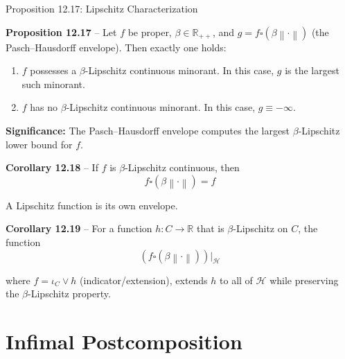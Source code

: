 \documentclass[aspectratio=169,10pt]{beamer}
\newcommand{\cH}{\mathcal{H}}
\newcommand{\R}{\mathbb{R}}
\newcommand{\norm}[1]{\left\|#1\right\|}
\newcommand{\co}{\square}
\begin{document}
\begin{frame}[allowframebreaks]{Proposition 12.17: Lipschitz Characterization}

  \textbf{Proposition 12.17} -- Let $f$ be proper, $\beta \in \R_{++}$,
  and $g = f \co (\beta \norm{\cdot})$ (the Pasch--Hausdorff envelope).
  Then exactly one holds:

  \begin{enumerate}
    \item[(i)] $f$ possesses a $\beta$-Lipschitz continuous minorant.
      In this case, $g$ is the largest such minorant.

    \item[(ii)] $f$ has no $\beta$-Lipschitz continuous minorant.
      In this case, $g \equiv -\infty$.
  \end{enumerate}

  \vspace{1cm}

  \textbf{Significance:} The Pasch--Hausdorff envelope computes the
  largest $\beta$-Lipschitz lower bound for $f$.

  \framebreak

  \textbf{Corollary 12.18} -- If $f$ is $\beta$-Lipschitz continuous, then
  \[
    f \co (\beta \norm{\cdot}) = f
  \]

  A Lipschitz function is its own envelope.

  \vspace{1cm}

  \textbf{Corollary 12.19} -- For a function $h: C \to \R$ that is
  $\beta$-Lipschitz on $C$, the function
  \[
    (f \co (\beta \norm{\cdot}))|_{\cH}
  \]

  where $f = \iota_C \vee h$ (indicator/extension), extends $h$ to
  all of $\cH$ while preserving the $\beta$-Lipschitz property.

\end{frame}

\section{Infimal Postcomposition}
\end{document}

